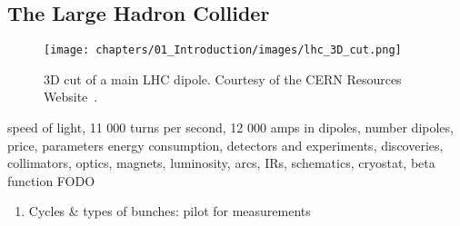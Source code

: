 \subsection{The Large Hadron Collider}

\begin{figure}[H]
    \texttt{[image: chapters/01\_Introduction/images/lhc\_3D\_cut.png]}
    \caption{3D cut of a main LHC dipole. Courtesy of the CERN Resources Website~\cite{noauthor_cern_nodate}.}
    \label{fig:3d_cut_dipole}
\end{figure}

speed of light, 11 000 turns per second, 12 000 amps in dipoles, number dipoles, price, parameters
energy consumption, detectors and experiments, discoveries, collimators, optics, magnets, luminosity, arcs, IRs, schematics, cryostat, beta function FODO

\begin{enumerate}
    \color{red}
    \item Cycles \& types of bunches: pilot for measurements
\end{enumerate}